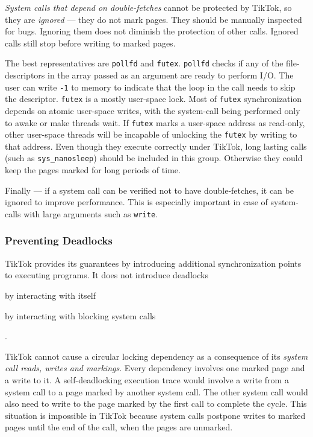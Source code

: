 \documentclass[conference]{IEEEtran}
\newcommand{\sysname}{TikTok}
\begin{document}
\emph{System calls that depend on double-fetches} cannot be protected by
\sysname{}, so they are \emph{ignored} --- they do not mark pages. They should
be manually inspected for bugs. Ignoring them does not diminish the protection
of other calls. Ignored calls still stop before writing to marked pages.

The best representatives are \texttt{pollfd} and \texttt{futex}. \texttt{pollfd}
checks if any of the file-descriptors in the array passed as an argument are
ready to perform I/O. The user can write \texttt{-1} to memory to indicate that
the loop in the call needs to skip the descriptor. \texttt{futex} is a mostly
user-space lock. Most of \texttt{futex} synchronization depends on atomic
user-space writes, with the system-call being performed only to awake or make
threads wait. If \texttt{futex} marks a user-space address as read-only, other
user-space threads will be incapable of unlocking the \texttt{futex} by writing
to that address. Even though they execute correctly under \sysname{}, long
lasting calls (such as \texttt{sys\_nanosleep}) should be included in this
group. Otherwise they could keep the pages marked for long periods of time.

Finally --- if a system call can be verified not to have double-fetches, it can
be ignored to improve performance. This is especially important in case of
system-calls with large arguments such as \texttt{write}.

\subsubsection{Preventing Deadlocks}
\label{subsubsec:deadlocks}

\sysname{} provides its guarantees by introducing additional synchronization
points to executing programs. It does not introduce deadlocks
\begin{enumerate*}\item by interacting with itself \item by interacting with
blocking system calls\end{enumerate*}.

\sysname{} cannot cause a circular locking dependency as a consequence of its
\emph{system call reads, writes and markings}. Every dependency involves one
marked page and a write to it. A self-deadlocking execution trace would involve
a write from a system call to a page marked by another system call. The other
system call would also need to write to the page marked by the first call to
complete the cycle. This situation is impossible in \sysname{} because system
calls postpone writes to marked pages until the end of the call, when the pages
are unmarked.
\end{document}
